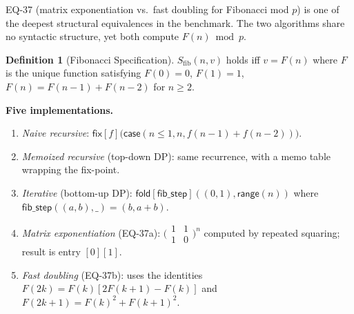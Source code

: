 \documentclass[11pt,a4paper]{report}
\theoremstyle{definition}
\newtheorem{definition}{Definition}[chapter]
\theoremstyle{plain}
\newcommand{\fold}{\mathsf{fold}}
\begin{document}
EQ-37 (matrix exponentiation vs.\ fast doubling for Fibonacci mod $p$)
is one of the deepest structural equivalences in the benchmark.  The
two algorithms share no syntactic structure, yet both compute
$F(n) \bmod p$.

\begin{definition}[Fibonacci Specification]
$S_{\mathrm{fib}}(n, v)$ holds iff $v = F(n)$ where $F$ is the unique
function satisfying $F(0) = 0$, $F(1) = 1$,
$F(n) = F(n{-}1) + F(n{-}2)$ for $n \ge 2$.
\end{definition}

\noindent\textbf{Five implementations.}
\begin{enumerate}
  \item \emph{Naive recursive}:
    $\mathsf{fix}[f]\bigl(\mathsf{case}(n \le 1, n,
      f(n{-}1) + f(n{-}2))\bigr)$.
  \item \emph{Memoized recursive} (top-down DP): same recurrence,
    with a memo table wrapping the fix-point.
  \item \emph{Iterative} (bottom-up DP):
    $\fold[\mathsf{fib\_step}]((0,1), \mathsf{range}(n))$ where
    $\mathsf{fib\_step}((\mathit{a},\mathit{b}), \_) =
      (\mathit{b}, \mathit{a}+\mathit{b})$.
  \item \emph{Matrix exponentiation} (EQ-37a):
    $\bigl(\begin{smallmatrix}1&1\\1&0\end{smallmatrix}\bigr)^n$
    computed by repeated squaring; result is entry $[0][1]$.
  \item \emph{Fast doubling} (EQ-37b): uses the identities
    $F(2k) = F(k)[2F(k{+}1) - F(k)]$ and
    $F(2k{+}1) = F(k)^2 + F(k{+}1)^2$.
\end{enumerate}
\end{document}
